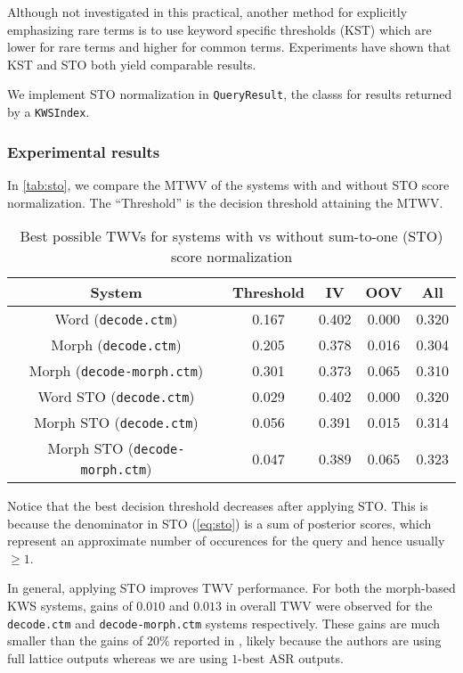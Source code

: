 \documentclass[a4paper,oneside,reqno]{amsart}
\begin{document}
Although not investigated in this practical, another method for explicitly
emphasizing rare terms is to use keyword specific thresholds (KST) which are lower
for rare terms and higher for common terms. Experiments have shown that KST and STO
both yield comparable results\cite{wang2014depth}.



We implement STO normalization in \texttt{QueryResult}, the classs for results
returned by a \texttt{KWSIndex}.

\subsubsection{Experimental results}

In \autoref{tab:sto}, we compare the MTWV of the systems with and without STO
score normalization. The ``Threshold'' is the decision threshold attaining
the MTWV.

\begin{table}[ht!]
  \begin{tabular}{ccccc}
    \toprule
    System                                & Threshold & IV    & OOV   & All \\
    \midrule
    Word (\texttt{decode.ctm})            & 0.167     & 0.402 & 0.000 & 0.320 \\
    Morph (\texttt{decode.ctm})           & 0.205     & 0.378 & 0.016 & 0.304 \\
    Morph (\texttt{decode-morph.ctm})     & 0.301     & 0.373 & 0.065 & 0.310 \\
    \hline
    Word STO (\texttt{decode.ctm})        & 0.029     & 0.402 & 0.000 & 0.320 \\
    Morph STO (\texttt{decode.ctm})       & 0.056     & 0.391 & 0.015 & 0.314 \\
    Morph STO (\texttt{decode-morph.ctm}) & 0.047     & 0.389 & 0.065 & 0.323 \\
    \bottomrule
  \end{tabular}
  \caption{Best possible TWVs for systems with vs without sum-to-one (STO) score normalization}
  \label{tab:sto}
\end{table}

Notice that the best decision threshold decreases after applying STO. This is
because the denominator in STO (\autoref{eq:sto}) is a sum of posterior scores,
which represent an approximate number of occurences for the query and hence
usually $\geq 1$.

In general, applying STO improves TWV performance. For both the morph-based KWS
systems, gains of $0.010$ and $0.013$ in overall TWV were observed for the
\texttt{decode.ctm} and \texttt{decode-morph.ctm} systems respectively.  These
gains are much smaller than the gains of $20\%$ reported in
\cite{mamou2013system}, likely because the authors are using full lattice
outputs whereas we are using $1$-best ASR outputs. %
\end{document}
